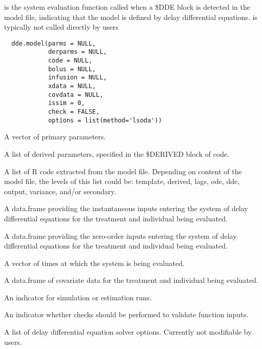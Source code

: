 %
\begin{Description}\relax
{} is the system evaluation function called when a \$DDE block is
detected in the model file, indicating that the model is defined by delay 
differential equations.  is typically not called directly by 
users
\end{Description}
%
\begin{Usage}
\begin{verbatim}
  dde.model(parms = NULL,
            derparms = NULL,
            code = NULL,
            bolus = NULL,
            infusion = NULL,
            xdata = NULL,
            covdata = NULL,
            issim = 0,
            check = FALSE,
            options = list(method='lsoda'))
\end{verbatim}
\end{Usage}
%
\begin{Arguments}
\begin{ldescription}
\item[\code{parms}] A vector of primary parameters.
\item[\code{derparms}] A list of derived parameters, specified in the \$DERIVED block
of code.
\item[\code{code}] A list of R code extracted from the model file. Depending on 
content of the model file, the levels of this list could be: template,
derived, lags, ode, dde, output, variance, and/or secondary.
\item[\code{bolus}] A data.frame providing the instantaneous inputs  entering the 
system of delay differential equations for the treatment and individual 
being evaluated.
\item[\code{infusion}] A data.frame providing the zero-order inputs entering the 
system of delay differential equations for the treatment and individual 
being evaluated.
\item[\code{xdata}] A vector of times at which the system is being evaluated.
\item[\code{covdata}] A data.frame of covariate data for the treatment and individual 
being evaluated.
\item[\code{issim}] An indicator for simulation or estimation runs.
\item[\code{check}] An indicator whether checks should be performed to validate 
function inputs.
\item[\code{options}] A list of delay differential equation solver options. Currently
not modifiable by users.
\end{ldescription}
\end{Arguments}
